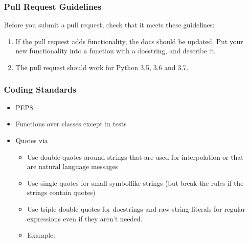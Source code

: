 \documentclass[letterpaper,10pt,english]{sphinxmanual}
\begin{document}
\subsubsection{Pull Request Guidelines}
\label{\detokenize{MANIFEST:pull-request-guidelines}}
Before you submit a pull request, check that it meets these guidelines:
\begin{enumerate}
%
\item {} 
If the pull request adds functionality, the docs should be updated. Put your new functionality into a function with a docstring, and describe it.

\item {} 
The pull request should work for Python 3.5, 3.6 and 3.7.

\end{enumerate}


\subsubsection{Coding Standards}
\label{\detokenize{MANIFEST:coding-standards}}\begin{itemize}
\item {} 
PEP8

\item {} 
Functions over classes except in tests

\item {} 
Quotes via 
\begin{itemize}
\item {} 
Use double quotes around strings that are used for interpolation or that are natural language messages

\item {} 
Use single quotes for small symbol\sphinxhyphen{}like strings (but break the rules if the strings contain quotes)

\item {} 
Use triple double quotes for docstrings and raw string literals for regular expressions even if they aren’t needed.

\item {} 
Example:

\end{itemize}

\end{itemize}
\end{document}
